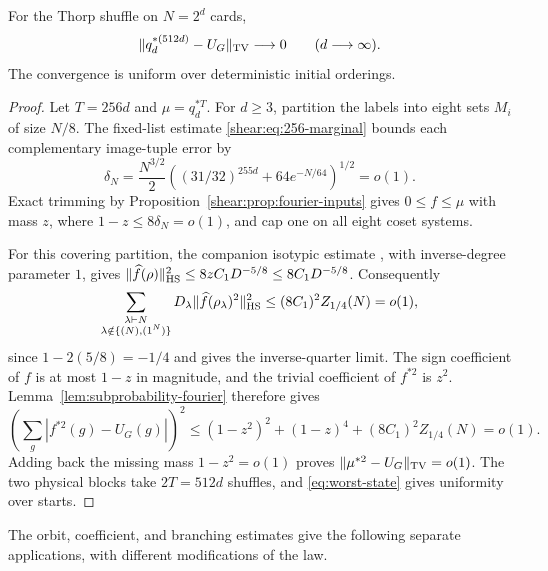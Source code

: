\begin{corollary}
\label{shear:cor:512}
For the Thorp shuffle on \(N=2^d\) cards,
\[
 \|q_d^{*(512d)}-U_G\|_{\mathrm{TV}}\longrightarrow0
 \qquad(d\longrightarrow\infty).
\]
The convergence is uniform over deterministic initial orderings.
\end{corollary}
\begin{proof}
Let \(T=256d\) and \(\mu=q_d^{*T}\). For \(d\ge3\), partition the labels
into eight sets \(M_i\) of size \(N/8\). The fixed-list estimate
\eqref{shear:eq:256-marginal} bounds each complementary image-tuple
error by
\[
 \delta_N=\frac{N^{3/2}}2
 \left((31/32)^{255d}+64e^{-N/64}\right)^{1/2}=o(1).
\]
Exact trimming by Proposition~\ref{shear:prop:fourier-inputs} gives
\(0\le f\le\mu\) with mass \(z\), where \(1-z\le8\delta_N=o(1)\), and
cap one on all eight coset systems.

For this covering partition, the companion isotypic estimate
\cite[Proposition~]{partial-fourier}, with inverse-degree
parameter \(1\), gives
\(\|\widehat f(\rho)\|_{\mathrm{HS}}^2\le8zC_1D^{-5/8}\le8C_1D^{-5/8}\).
Consequently
\[
 \sum_{\substack{\lambda\vdash N\\
                  \lambda\notin\{(N),(1^N)\}}}
 D_\lambda\|\widehat f(\rho_\lambda)^2\|_{\mathrm{HS}}^2
 \le(8C_1)^2Z_{1/4}(N)=o(1),
\]
since \(1-2(5/8)=-1/4\) and
\cite[Theorem~]{partial-fourier}
gives the inverse-quarter limit. The sign coefficient of \(f\) is at
most \(1-z\) in magnitude, and the trivial coefficient of \(f^{*2}\)
is \(z^2\). Lemma~\ref{lem:subprobability-fourier} therefore gives
\[
 \left(\sum_g|f^{*2}(g)-U_G(g)|\right)^2
 \le(1-z^2)^2+(1-z)^4+(8C_1)^2Z_{1/4}(N)=o(1).
\]
Adding back the missing mass \(1-z^2=o(1)\) proves
\(\|\mu^{*2}-U_G\|_{\mathrm{TV}}=o(1)\). The two physical blocks take
\(2T=512d\) shuffles, and \eqref{eq:worst-state} gives uniformity over starts.
\end{proof}

The orbit, coefficient, and branching estimates give the following
separate applications, with different modifications of the law.

